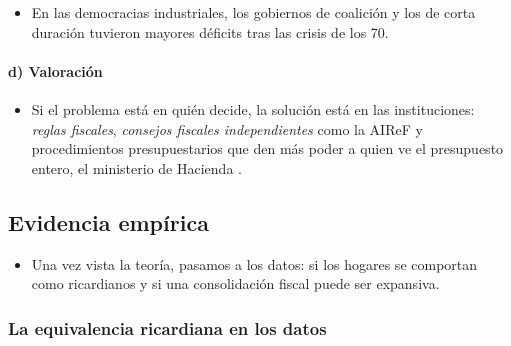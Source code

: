 \documentclass[11pt]{article}
\begin{document}
\begin{itemize}
\item En las democracias industriales, los gobiernos de coalición y los de corta duración tuvieron mayores déficits tras las crisis de los 70\nocite{RoubiniSachs1989Political}.
\end{itemize}

\paragraph{d) Valoración}

\begin{itemize}
\item Si el problema está en quién decide, la solución está en las instituciones: \emph{reglas fiscales}, \emph{consejos fiscales independientes} como la AIReF y procedimientos presupuestarios que den más poder a quien ve el presupuesto entero, el ministerio de Hacienda  .
\end{itemize}

\subsection{Evidencia empírica}\label{sec:evidencia}

\begin{itemize}
\item Una vez vista la teoría, pasamos a los datos: si los hogares se comportan como ricardianos y si una consolidación fiscal puede ser expansiva.
\end{itemize}

\subsubsection{La equivalencia ricardiana en los datos}\label{sec:evidencia-ricardiana}
\end{document}
